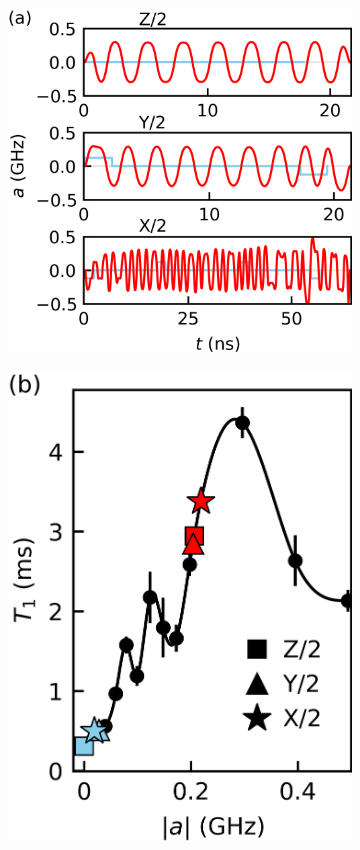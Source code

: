 \begin{figure}[ht]
  
  \begin{subfigure}{.315\textwidth}
    \includegraphics[width=\linewidth]{assets/f1a.png}
  \end{subfigure}\hfill
  \begin{subfigure}{.23\textwidth}
    \includegraphics[width=\linewidth]{assets/f1b.png}

\end{subfigure}
\end{figure}
